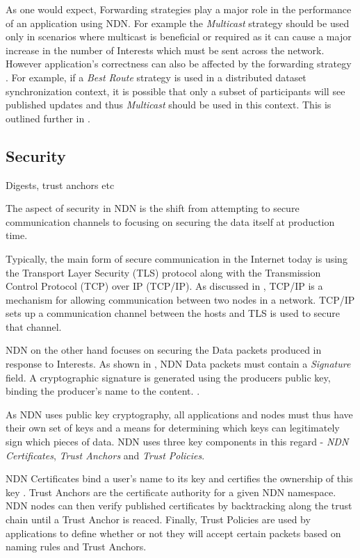 As one would expect, Forwarding strategies play a major role in the performance of an application using NDN. For example the \textit{Multicast} strategy should be used only in scenarios where multicast is beneficial or required as it can cause a major increase in the number of Interests which must be sent across the network. However application’s correctness can also be affected by the forwarding strategy \cite{forwarding-strategies}. For example, if a \textit{Best Route} strategy is used in a distributed dataset synchronization context, it is possible that only a subset of participants will see published updates and thus \textit{Multicast} should be used in this context. This is outlined further in .


\subsection{Security}
Digests, trust anchors etc

The aspect of security in NDN is the shift from attempting to secure communication channels to focusing on securing the data itself at production time. 

Typically, the main form of secure communication in the Internet today is using the Transport Layer Security (TLS) protocol \cite{TLS}  along with the Transmission Control Protocol (TCP) over IP (TCP/IP). As discussed in , TCP/IP is a mechanism for allowing communication between two nodes in a network. TCP/IP sets up a communication channel between the hosts and TLS is used to secure that channel. 

NDN on the other hand focuses on securing the Data packets produced in response to Interests. As shown in , NDN Data packets must contain a \textit{Signature} field. A cryptographic signature is generated using the producers public key, binding the producer's name to the content. \cite{ndn-security-overview}.

As NDN uses public key cryptography, all applications and nodes must thus have their own set of keys and a means for determining which keys can legitimately sign which pieces of data. NDN uses three key components in this regard - \textit{NDN Certificates}, \textit{Trust Anchors} and \textit{Trust Policies}.

NDN Certificates bind a user's name to its key and certifies the ownership of this key \cite{ndn-security-overview}. Trust Anchors are the certificate authority for a given NDN namespace. NDN nodes can then verify published certificates by backtracking along the trust chain until a Trust Anchor is reaced. Finally, Trust Policies are used by applications to define whether or not they will accept certain packets based on naming rules and Trust Anchors.

